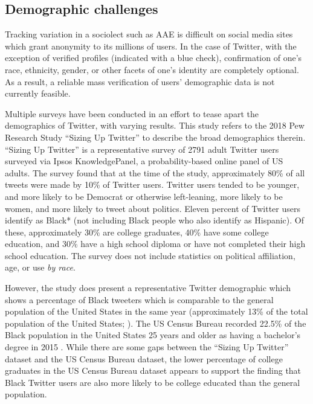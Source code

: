 \documentclass[output=paper,draftmode,colorlinks,citecolor=brown]{langscibook}
\begin{document}
\subsection{Demographic challenges}
\label{sec:baxter:2.2}

Tracking variation in a sociolect such as AAE is difficult on social media sites which grant anonymity to its millions of users. In the case of Twitter, with the exception of verified profiles (indicated with a blue check), confirmation of one’s race, ethnicity, gender, or other facets of one’s identity are completely optional. As a result, a reliable mass verification of users’ demographic data is not currently feasible. 


Multiple surveys have been conducted in an effort to tease apart the demographics of Twitter, with varying results. This study refers to the 2018 Pew Research Study “Sizing Up Twitter” to describe the broad demographics therein. “Sizing Up Twitter” is a representative survey of 2791 adult Twitter users surveyed via Ipsos KnowledgePanel, a probability-based online panel of US adults. The survey found that at the time of the study, approximately 80\% of all tweets were made by 10\% of Twitter users. Twitter users tended to be younger, and more likely to be Democrat or otherwise left-leaning, more likely to be women, and more likely to tweet about politics. Eleven percent of Twitter users identify as Black* (not including Black people who also identify as Hispanic). Of these, approximately 30\% are college graduates, 40\% have some college education, and 30\% have a high school diploma or have not completed their high school education. The survey does not include statistics on political affiliation, age, or use \textit{by race}. 

However, the study does present a representative Twitter demographic which shows a percentage of Black tweeters which is comparable to the general population of the United States in the same year (approximately 13\% of the total population of the United States; \citealt{Bureau2018}). The US Census Bureau recorded 22.5\% of the Black population in the United States 25 years and older as having a bachelor’s degree in 2015 \citep{RyanBauman2015}. While there are some gaps between the “Sizing Up Twitter” dataset and the US Census Bureau dataset, the lower percentage of college graduates in the US Census Bureau dataset appears to support the finding that Black Twitter users are also more likely to be college educated than the general population.
\end{document}
